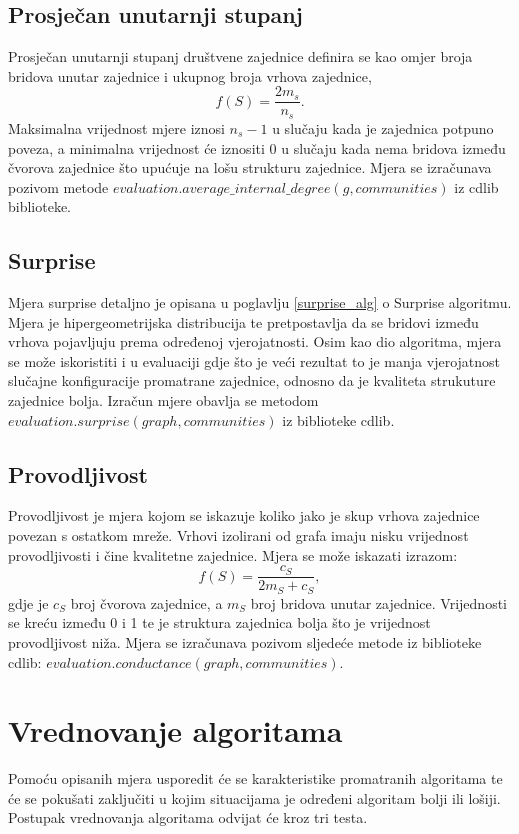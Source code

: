 \pagebreak
\subsection{Prosječan unutarnji stupanj}
Prosječan unutarnji stupanj društvene zajednice definira se kao omjer broja bridova unutar zajednice i ukupnog broja vrhova zajednice,
\begin{equation}
	f(S) =  \frac{2m_{s}}{n_{s}}.
\end{equation}
Maksimalna vrijednost mjere iznosi $n_{s} - 1$ u slučaju kada je zajednica potpuno poveza, a minimalna vrijednost će iznositi 0 u slučaju kada nema bridova između čvorova zajednice što upućuje na lošu strukturu zajednice. Mjera se izračunava pozivom metode $evaluation.average\_internal\_degree(g,communities)$ iz cdlib biblioteke.


\subsection{Surprise}
Mjera surprise detaljno je opisana u poglavlju \ref{surprise_alg} o Surprise algoritmu. Mjera je hipergeometrijska distribucija te pretpostavlja da se bridovi između vrhova pojavljuju prema određenoj vjerojatnosti. Osim kao dio algoritma, mjera se može iskoristiti i u evaluaciji gdje što je veći rezultat to je manja vjerojatnost slučajne konfiguracije promatrane zajednice, odnosno da je kvaliteta strukuture zajednice bolja. Izračun mjere obavlja se metodom $evaluation.surprise(graph, communities)$ iz biblioteke cdlib.


\subsection{Provodljivost}
Provodljivost je mjera kojom se iskazuje koliko jako je skup vrhova zajednice povezan s ostatkom mreže. Vrhovi izolirani od grafa imaju nisku vrijednost provodljivosti i čine kvalitetne zajednice. Mjera se može iskazati izrazom:
\begin{equation}
	f(S) = \frac{c_{S}}{2m_{S} + c_{S}},
\end{equation}
gdje je $c_{S}$ broj čvorova zajednice, a $m_{S}$ broj bridova unutar zajednice. Vrijednosti se kreću između 0 i 1 te je struktura zajednica bolja što je vrijednost provodljivost niža. Mjera se izračunava pozivom sljedeće metode iz biblioteke cdlib: $evaluation.conductance(graph, communities)$.


\pagebreak
\section{Vrednovanje algoritama}
Pomoću opisanih mjera usporedit će se karakteristike promatranih algoritama te će se pokušati zaključiti u kojim situacijama je određeni algoritam bolji ili lošiji. Postupak vrednovanja algoritama odvijat će kroz tri testa. 

